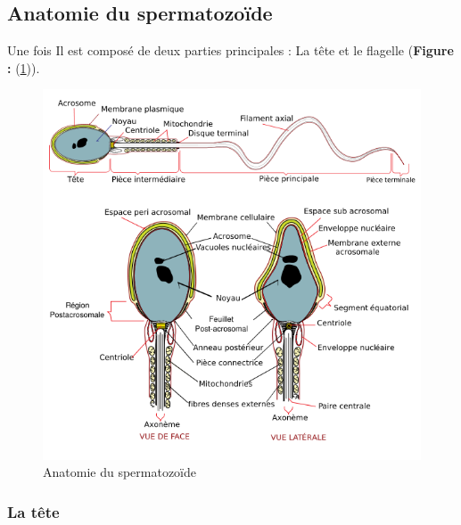 \documentclass[12pt,twoside]{reedthesis}
\theoremstyle{definition}
\theoremstyle{definition}
\theoremstyle{remark}
\begin{document}
  \subsection{Anatomie du spermatozoïde}\label{anatomie-du-spermatozoide}
  
  Une fois Il est composé de deux parties principales : La tête et le
  flagelle (\textbf{Figure : }(\ref{fig:spz})).
  
  \begin{figure}
  
  {\centering \includegraphics[scale=.6]{figure/spermatozoide} 
  
  }
  
  \caption[Anatomie du spermatozoïde]{Anatomie du spermatozoïde}\label{fig:spz}
  \end{figure}
  
  \subsubsection{La tête}\label{la-tete}
  
\end{document}
